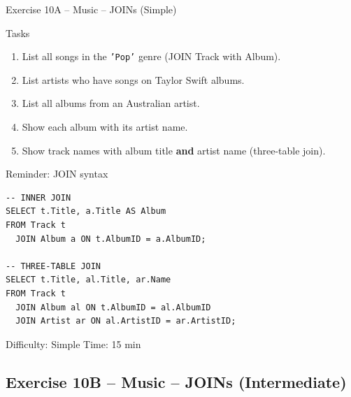 \documentclass[10pt]{beamer}
\begin{document}
\begin{frame}[fragile]{Exercise 10A -- Music -- JOINs (Simple)}
  \begin{block}{Tasks}
    \begin{enumerate}
      \item List all songs in the \texttt{'Pop'} genre (JOIN Track with Album).
      \item List artists who have songs on Taylor Swift albums.
      \item List all albums from an Australian artist.
      \item Show each album with its artist name.
      \item Show track names with album title \textbf{and} artist name (three-table join).
    \end{enumerate}
  \end{block}

  \begin{block}{Reminder: JOIN syntax}
\begin{lstlisting}[style=sqlstyle]
-- INNER JOIN
SELECT t.Title, a.Title AS Album
FROM Track t
  JOIN Album a ON t.AlbumID = a.AlbumID;

-- THREE-TABLE JOIN
SELECT t.Title, al.Title, ar.Name
FROM Track t
  JOIN Album al ON t.AlbumID = al.AlbumID
  JOIN Artist ar ON al.ArtistID = ar.ArtistID;
\end{lstlisting}
  \end{block}

  \begin{alertblock}{Difficulty: Simple \quad Time: 15 min}
  \end{alertblock}
\end{frame}

\subsection{Exercise 10B -- Music -- JOINs (Intermediate)}
\end{document}
